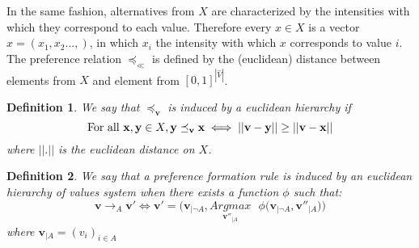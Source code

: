 \documentclass[11pt]{article}
\newtheorem{definition}{Definition}
\begin{document}
In the same fashion, alternatives from $X$ are characterized by the intensities with which they correspond to each value. Therefore every $x\in X$ is a vector $x=(x_1,x_2...,)$, in which $x_i$ the intensity with which $x$ corresponds to value $i$. The preference relation $\preceq_{\ll}$ is defined by the (euclidean) distance between elements from $X$ and element from $[0,1]^{|\hat{V}|}$.

\begin{definition}
We say that $\preceq_{\textbf{v}}$ is induced by a euclidean hierarchy if 
\begin{equation}
\textrm{For all }\textbf{x},\textbf{y}\in X, \textbf{y}\preceq_{\textbf{\textbf{v}}} \textbf{x} \iff ||\textbf{v}-\textbf{y}|| \geq ||\textbf{v}-\textbf{x}||
\end{equation}
where $||.||$ is the euclidean distance on $X$. 
\end{definition}

\begin{definition}
We say that a preference formation rule is induced  by an euclidean hierarchy of values system when there exists a function $\phi$ such that:
\begin{equation}
\textbf{v}\rightarrow_A \textbf{v}' \iff \textbf{v}'  = \bigg(\textbf{v}_{|\neg A },\underset{\textbf{v}''_{|A}}{Argmax}\text{ } \phi\big( \textbf{v}_{| \neg A},\textbf{v}''_{|A}\big) \bigg)
\label{2}
\end{equation}
where $\textbf{v}_{|A} = (v_i)_{i\in A}$  

\end{definition}
\end{document}
